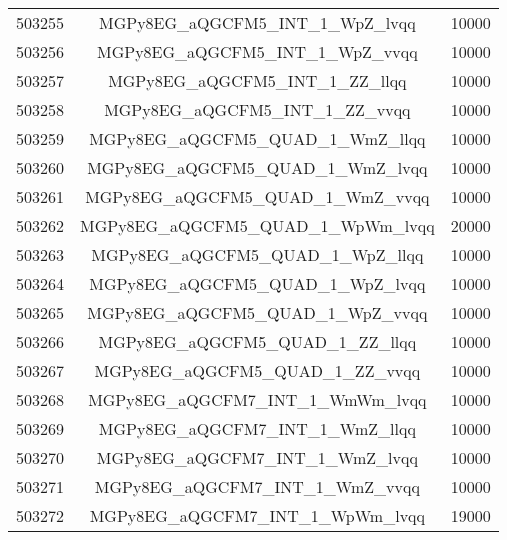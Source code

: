 \begin{table}[!htbp]
\begin{center}
\begin{tabular}{c|c|c}
503255 & MGPy8EG\_aQGCFM5\_INT\_1\_WpZ\_lvqq     & 10000 \\
503256 & MGPy8EG\_aQGCFM5\_INT\_1\_WpZ\_vvqq     & 10000 \\
503257 & MGPy8EG\_aQGCFM5\_INT\_1\_ZZ\_llqq      & 10000 \\
503258 & MGPy8EG\_aQGCFM5\_INT\_1\_ZZ\_vvqq      & 10000 \\
503259 & MGPy8EG\_aQGCFM5\_QUAD\_1\_WmZ\_llqq    & 10000 \\
503260 & MGPy8EG\_aQGCFM5\_QUAD\_1\_WmZ\_lvqq    & 10000 \\
503261 & MGPy8EG\_aQGCFM5\_QUAD\_1\_WmZ\_vvqq    & 10000 \\
503262 & MGPy8EG\_aQGCFM5\_QUAD\_1\_WpWm\_lvqq   & 20000 \\
503263 & MGPy8EG\_aQGCFM5\_QUAD\_1\_WpZ\_llqq    & 10000 \\
503264 & MGPy8EG\_aQGCFM5\_QUAD\_1\_WpZ\_lvqq    & 10000 \\
503265 & MGPy8EG\_aQGCFM5\_QUAD\_1\_WpZ\_vvqq    & 10000 \\
503266 & MGPy8EG\_aQGCFM5\_QUAD\_1\_ZZ\_llqq     & 10000 \\
503267 & MGPy8EG\_aQGCFM5\_QUAD\_1\_ZZ\_vvqq     & 10000 \\
503268 & MGPy8EG\_aQGCFM7\_INT\_1\_WmWm\_lvqq    & 10000 \\
503269 & MGPy8EG\_aQGCFM7\_INT\_1\_WmZ\_llqq     & 10000 \\
503270 & MGPy8EG\_aQGCFM7\_INT\_1\_WmZ\_lvqq     & 10000 \\
503271 & MGPy8EG\_aQGCFM7\_INT\_1\_WmZ\_vvqq     & 10000 \\
503272 & MGPy8EG\_aQGCFM7\_INT\_1\_WpWm\_lvqq    & 19000 \\


\hline
\end{tabular}
\label{tabular:mc_samples_aqgc_3}
\end{center}
\end{table}


